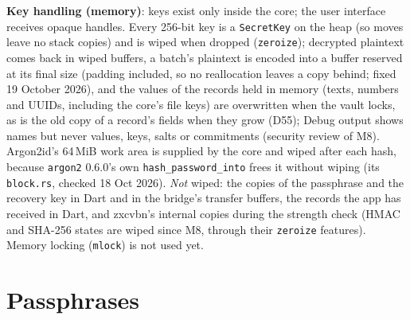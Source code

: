 \documentclass[11pt,a4paper]{article}
\newcommand{\dref}[1]{\textsf{#1}} %
\begin{document}
\noindent\textbf{Key handling (memory)}: keys exist only inside the core; the user interface receives opaque handles. Every 256-bit key is a \texttt{SecretKey} on the heap (so moves leave no stack copies) and is wiped when dropped (\texttt{zeroize}); decrypted plaintext comes back in wiped buffers, a batch's plaintext is encoded into a buffer reserved at its final size (padding included, so no reallocation leaves a copy behind; fixed 19 October 2026), and the values of the records held in memory (texts, numbers and UUIDs, including the core's file keys) are overwritten when the vault locks, as is the old copy of a record's fields when they grow (\dref{D55}); Debug output shows names but never values, keys, salts or commitments (security review of M8). Argon2id's 64\,MiB work area is supplied by the core and wiped after each hash, because \texttt{argon2} 0.6.0's own \texttt{hash\_password\_into} frees it without wiping (its \texttt{block.rs}, checked 18 Oct 2026). \emph{Not} wiped: the copies of the passphrase and the recovery key in Dart and in the bridge's transfer buffers, the records the app has received in Dart, and zxcvbn's internal copies during the strength check (HMAC and SHA-256 states are wiped since M8, through their \texttt{zeroize} features). Memory locking (\texttt{mlock}) is not used yet.

\section{Passphrases}
\label{sec:passphrase}
\end{document}
